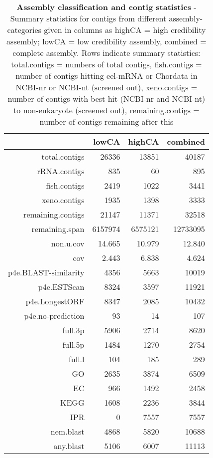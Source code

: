 \begin{table}[!h]
  \begin{center}
  \begin{tabular}{rrrr}
  \hline
 & lowCA & highCA & combined \\ 
  \hline
total.contigs & 26336 & 13851 & 40187 \\ 
  rRNA.contigs & 835 & 60 & 895 \\ 
  fish.contigs & 2419 & 1022 & 3441 \\ 
  xeno.contigs & 1935 & 1398 & 3333 \\ 
  remaining.contigs & 21147 & 11371 & 32518 \\ 
  remaining.span & 6157974 & 6575121 & 12733095 \\ 
  non.u.cov & 14.665 & 10.979 & 12.840 \\ 
  cov & 2.443 & 6.838 & 4.624 \\ 
  p4e.BLAST-similarity & 4356 & 5663 & 10019 \\ 
  p4e.ESTScan & 8324 & 3597 & 11921 \\ 
  p4e.LongestORF & 8347 & 2085 & 10432 \\ 
  p4e.no-prediction & 93 & 14 & 107 \\ 
  full.3p & 5906 & 2714 & 8620 \\ 
  full.5p & 1484 & 1270 & 2754 \\ 
  full.l & 104 & 185 & 289 \\ 
  GO & 2635 & 3874 & 6509 \\ 
  EC & 966 & 1492 & 2458 \\ 
  KEGG & 1608 & 2236 & 3844 \\ 
  IPR & 0 & 7557 & 7557 \\ 
  nem.blast & 4868 & 5820 & 10688 \\ 
  any.blast & 5106 & 6007 & 11113 \\ 
   \hline
\end{tabular}
\caption[Assembly classification and contig
statistics]{\textbf{Assembly classification and contig statistics} -
  Summary statistics for contigs from different assembly-categories
  given in columns as highCA = high credibility assembly; lowCA = low
  credibility assembly, combined = complete assembly. Rows indicate
  summary statistics: total.contigs = numbers of total contigs,
  fish.contigs = number of contigs hitting eel-mRNA or Chordata in
  NCBI-nr or NCBI-nt (screened out), xeno.contigs = number of contigs
  with best hit (NCBI-nr and NCBI-nt) to non-eukaryote (screened out),
  remaining.contigs = number of contigs remaining after this
}
\end{center}
\end{table}
